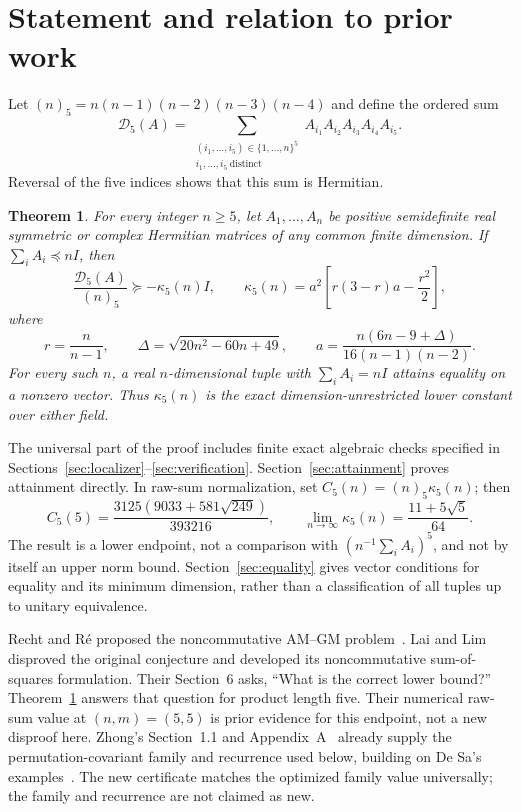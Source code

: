 \documentclass[11pt]{article}
\newtheorem{theorem}{Theorem}
\newcommand{\D}{\mathcal D_5}
\begin{document}
\section{Statement and relation to prior work}\label{sec:statement}
Let $(n)_5=n(n-1)(n-2)(n-3)(n-4)$ and define the ordered sum
\[
 \D(A)=\sum_{\substack{(i_1,\ldots,i_5)\in\{1,\ldots,n\}^5\\
                       i_1,\ldots,i_5\ \mathrm{distinct}}}
 A_{i_1}A_{i_2}A_{i_3}A_{i_4}A_{i_5}.
\]
Reversal of the five indices shows that this sum is Hermitian.
\begin{theorem}\label{thm:main}
For every integer $n\ge5$, let $A_1,\ldots,A_n$ be positive semidefinite
real symmetric or complex Hermitian matrices of any common finite dimension.
If $\sum_iA_i\preceq nI$, then
\begin{equation}\label{eq:main}
 \frac{\D(A)}{(n)_5}\succeq-\kappa_5(n)I,
 \qquad \kappa_5(n)=a^2\left[r(3-r)a-\frac{r^2}{2}\right],
\end{equation}
where
\begin{equation}\label{eq:parameters}
 r=\frac n{n-1},\qquad \Delta=\sqrt{20n^2-60n+49},\qquad
 a=\frac{n(6n-9+\Delta)}{16(n-1)(n-2)}.
\end{equation}
For every such $n$, a real $n$-dimensional tuple with $\sum_iA_i=nI$
attains equality on a nonzero vector. Thus $\kappa_5(n)$ is the exact
dimension-unrestricted lower constant over either field.
\end{theorem}
The universal part of the proof includes finite exact algebraic checks
specified in Sections~\ref{sec:localizer}--\ref{sec:verification}.
Section~\ref{sec:attainment} proves attainment directly. In raw-sum
normalization, set $C_5(n)=(n)_5\kappa_5(n)$; then
\[
 C_5(5)=\frac{3125(9033+581\sqrt{249})}{393216},\qquad
 \lim_{n\to\infty}\kappa_5(n)=\frac{11+5\sqrt5}{64}.
\]
The result is a lower endpoint, not a comparison with
$(n^{-1}\sum_iA_i)^5$, and not by itself an upper norm bound.
Section~\ref{sec:equality} gives vector conditions for equality and its
minimum dimension, rather than a classification of all tuples up to
unitary equivalence.

Recht and R\'e proposed the noncommutative AM--GM problem~\cite{recht-re}.
Lai and Lim~\cite{lai-lim} disproved the original conjecture and developed
its noncommutative sum-of-squares formulation. Their Section~6 asks,
``What is the correct lower bound?'' Theorem~\ref{thm:main} answers that
question for product length five. Their numerical raw-sum value at
$(n,m)=(5,5)$ is prior evidence for this endpoint, not a new disproof here.
Zhong's Section~1.1 and Appendix~A~\cite{zhong} already supply the
permutation-covariant family and recurrence used below, building on
De Sa's examples~\cite{desa}. The new certificate matches the optimized
family value universally; the family and recurrence are not claimed as new.
\end{document}
